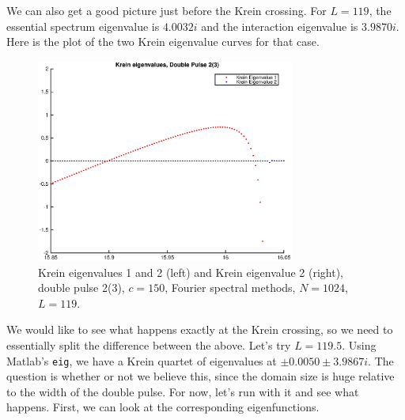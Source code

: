 \documentclass[12pt]{article}
\begin{document}
We can also get a good picture just before the Krein crossing. For $L = 119$, the essential spectrum eigenvalue is $4.0032i$ and the interaction eigenvalue is $3.9870i$. Here is the plot of the two Krein eigenvalue curves for that case.

\begin{figure}[H]
	\includegraphics[width=8.5cm]{1500F_dp2_119_krein1.eps}
	\caption{Krein eigenvalues 1 and 2 (left) and Krein eigenvalue 2 (right), double pulse 2(3), $c = 150$, Fourier spectral methods, $N = 1024$, $L = 119$. }
\end{figure}

We would like to see what happens exactly at the Krein crossing, so we need to essentially split the difference between the above. Let's try $L = 119.5$. Using Matlab's \texttt{eig}, we have a Krein quartet of eigenvalues at $\pm0.0050 \pm 3.9867i$. The question is whether or not we believe this, since the domain size is huge relative to the width of the double pulse. For now, let's run with it and see what happens. First, we can look at the corresponding eigenfunctions. 
\end{document}
